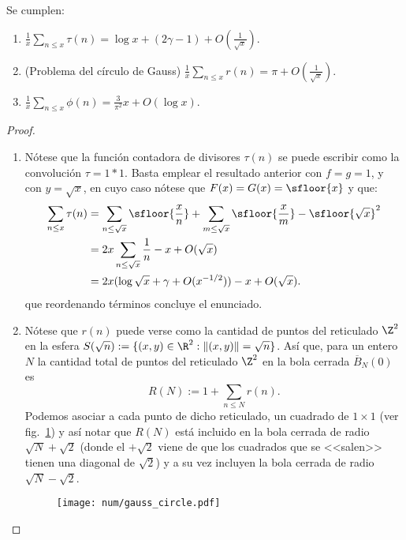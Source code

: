\documentclass[teoria-numeros.tex]{subfiles}
\begin{document}
\nocite{hlawka:number}
\begin{thm}
	Se cumplen:
	\begin{enumerate}
		\item $\displaystyle \frac{1}{x} \sum_{n\le x} \tau(n) = \log x + (2\gamma - 1) + O\left( \frac{1}{\sqrt{x}} \right).$
		\item (Problema del círculo de Gauss)
			$\displaystyle \frac{1}{x} \sum_{n\le x} r(n) = \pi + O\left( \frac{1}{\sqrt{x}} \right).$
		\item $\displaystyle \frac{1}{x} \sum_{n\le x} \phi(n) = \frac{3}{\pi^2} x + O(\log x). $
	\end{enumerate}
\end{thm}
\begin{proof}
	\begin{enumerate}
		\item Nótese que la función contadora de divisores $\tau(n)$ se puede escribir como la convolución $\tau = 1*1$.
			Basta emplear el resultado anterior con $f = g = 1$, y con $y = \sqrt{x}$, en cuyo caso
			nótese que $F(x) = G(x) = \sfloor{x}$ y que:
			\begin{align*}
				\sum_{n\le x} \tau(n) &= \sum_{n\le\sqrt{x}} \sfloor{ \frac{x}{n} } + \sum_{m \le \sqrt{x}} \sfloor{ \frac{x}{m} }
				- \sfloor{ \sqrt{x} }^2 \\
						      &= 2x\sum_{n \le \sqrt{x}} \frac{1}{n} - x + O(\sqrt{x}) \\
						      &= 2x( \log\sqrt{x} + \gamma + O( x^{-1/2} ) ) - x
						      + O(\sqrt{x}).
			\end{align*}
			que reordenando términos concluye el enunciado.
		\item Nótese que $r(n)$ puede verse como la cantidad de puntos del reticulado $\Z^2$ en la esfera $S(\sqrt{n}) := \{ (x, y) \in \R^2 :
			\|(x, y)\| = \sqrt{n} \}$.
			Así que, para un entero $N$ la cantidad total de puntos del reticulado $\Z^2$ en la bola cerrada $\overline{B}_N(0)$ es
			$$ R(N) := 1 + \sum_{n \le N} r(n). $$
			Podemos asociar a cada punto de dicho reticulado, un cuadrado de $1\times 1$ (ver fig.~\ref{fig:num/gauss_circle})
			y así notar que $R(N)$ está incluido en la bola cerrada de radio $\sqrt{N} + \sqrt{2}$ (donde el $+ \sqrt{2}$ viene de que los cuadrados
			que se <<salen>> tienen una diagonal de $\sqrt{2}$) y a su vez incluyen la bola cerrada de radio $\sqrt{N} - \sqrt{2}$.
			\begin{figure}[!hbtp]
				\centering
				\texttt{[image: num/gauss\_circle.pdf]}
				\caption{}%
				\label{fig:num/gauss_circle}
			\end{figure}


\end{enumerate}
\end{proof}
\end{document}
